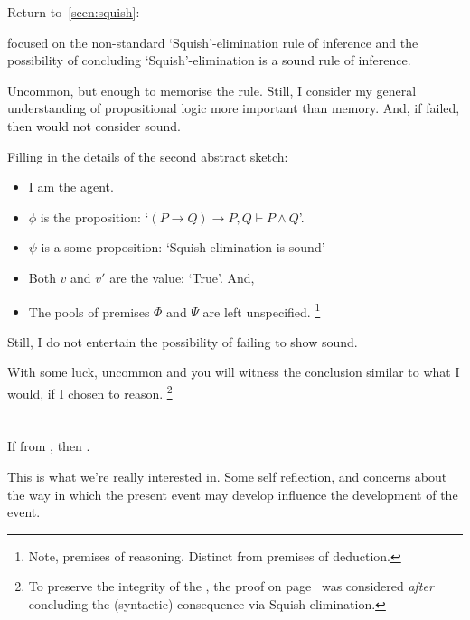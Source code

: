 \begin{note}
  Return to~\autoref{scen:squish}:

  \scenarioPLSquish*

   focused on the non-standard `Squish'-elimination rule of inference and the possibility of concluding `Squish'-elimination is a sound rule of inference.

  Uncommon, but enough to memorise the rule.
  Still, I consider my general understanding of propositional logic more important than memory.
  And, if failed, then would not consider sound.

  Filling in the details of the second abstract sketch:
  \begin{itemize}[noitemsep]
  \item
    I am the agent.
  \item
    \(\phi\) is the proposition: `\((P \rightarrow Q) \rightarrow P, Q \vdash P \land Q\)'.
  \item
    \(\psi\) is a some proposition: `Squish elimination is sound'
  \item
    Both \(v\) and \(v'\) are the value: `True'.
    And,
  \item
    The pools of premises \(\Phi\) and \(\Psi\) are left unspecified.%
    \footnote{
      Note, premises of reasoning.
      Distinct from premises of deduction.
    }
  \end{itemize}

  Still, I do not entertain the possibility of failing to show sound.

  With some luck, uncommon and you will witness the conclusion similar to what I would, if I chosen to reason.%
  \footnote{
    To preserve the integrity of the , the proof on page~\pageref{squish-elimination-proof} was considered \emph{after} concluding the (syntactic) consequence via Squish-elimination.
  }
\end{note}

\section{}

\begin{note}
  \begin{definition}[\feedback{2}]
    If \curb{} from \agpe{}, then \curb{}.
  \end{definition}

  This is what we're really interested in.
  Some self reflection, and concerns about the way in which the present event may develop influence the development of the event.
\end{note}

